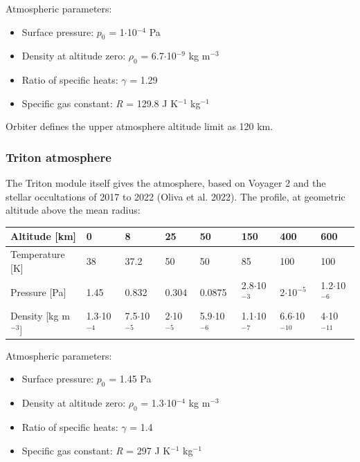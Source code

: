\documentclass[Orbiter Developer Manual.tex]{subfiles}
\begin{document}
\noindent
Atmospheric parameters:

\begin{itemize}
\item Surface pressure: $p_{0}$ = 1$\cdot$10$^{-4}$ Pa
\item Density at altitude zero: $\rho_{0}$ = 6.7$\cdot$10$^{-9}$ kg m$^{-3}$
\item Ratio of specific heats: $\gamma$ = 1.29
\item Specific gas constant: \textit{R} = 129.8 J K$^{-1}$ kg$^{-1}$
\end{itemize}

\noindent
Orbiter defines the upper atmosphere altitude limit as 120 km.


\subsubsection{Triton atmosphere}
The Triton module itself gives the atmosphere, based on Voyager 2 and the stellar occultations of 2017 to 2022 (Oliva et al. 2022). The profile, at geometric altitude above the mean radius:

{\setlength{\tabcolsep}{3pt}
	\begin{longtable}{ |p{}|p{}|p{}|p{}|p{}|p{}|p{}|p{}| }
	\hline\rule{0pt}{2ex}
	Altitude [km] & 0 & 8 & 25 & 50 & 150 & 400 & 600\\
	\hline\rule{0pt}{2ex}
	Temperature [K] & 38 & 37.2 & 50 & 50 & 85 & 100 & 100\\
	\hline\rule{0pt}{2ex}
	Pressure [Pa] & 1.45 & 0.832 & 0.304 & 0.0875 & 2.8$\cdot$10$^{-3}$ & 2$\cdot$10$^{-5}$ & 1.2$\cdot$10$^{-6}$\\
	\hline\rule{0pt}{2ex}
	Density [kg m$^{-3}$] & 1.3$\cdot$10$^{-4}$ & 7.5$\cdot$10$^{-5}$ & 2$\cdot$10$^{-5}$ & 5.9$\cdot$10$^{-6}$ & 1.1$\cdot$10$^{-7}$ & 6.6$\cdot$10$^{-10}$ & 4$\cdot$10$^{-11}$\\
	\hline
	\end{longtable}
}

\noindent
Atmospheric parameters:

\begin{itemize}
\item Surface pressure: $p_{0}$ = 1.45 Pa
\item Density at altitude zero: $\rho_{0}$ = 1.3$\cdot$10$^{-4}$ kg m$^{-3}$
\item Ratio of specific heats: $\gamma$ = 1.4
\item Specific gas constant: \textit{R} = 297 J K$^{-1}$ kg$^{-1}$
\end{itemize}
\end{document}
